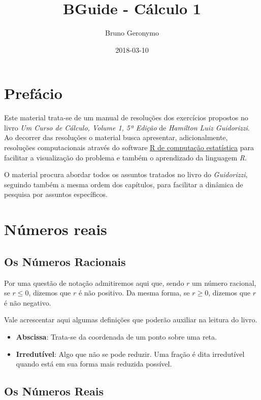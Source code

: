 \documentclass[]{book}
\title{BGuide - Cálculo 1}
\author{Bruno Geronymo}
\date{2018-03-10}
\providecommand{\tightlist}{%
  \setlength{\itemsep}{0pt}\setlength{\parskip}{0pt}}
\begin{document}
\maketitle

{
\setcounter{tocdepth}{1}
\tableofcontents
}
\chapter*{Prefácio}\label{prefacio}

Este material trata-se de um manual de resoluções dos exercícios
propostos no livro \emph{Um Curso de Cálculo, Volume 1, 5ª Edição} de
\emph{Hamilton Luiz Guidorizzi}. Ao decorrer das resoluções o material
busca apresentar, adicionalmente, resoluções computacionais através do
software \href{https://www.r-project.org/}{R de computação estatística}
para facilitar a visualização do problema e também o aprendizado da
linguagem \emph{R}.

O material procura abordar todos os assuntos tratados no livro do
\emph{Guidorizzi}, seguindo também a mesma ordem dos capítulos, para
facilitar a dinâmica de pesquisa por assuntos específicos.

\chapter{Números reais}\label{numeros-reais}

\section{Os Números Racionais}\label{os-numeros-racionais}

Por uma questão de notação admitiremos aqui que, sendo \(r\) um número
racional, se \(r \leqslant 0\), dizemos que \(r\) é não positivo. Da
mesma forma, se \(r \geqslant 0\), dizemos que \(r\) é não negativo.

Vale acrescentar aqui algumas definições que poderão auxiliar na leitura
do livro.

\begin{itemize}
\tightlist
\item
  \textbf{Abscissa}: Trata-se da coordenada de um ponto sobre uma reta.
\item
  \textbf{Irredutível}: Algo que não se pode reduzir. Uma fração é dita
  irredutível quando está em sua forma mais reduzida possível.
\end{itemize}

\section{Os Números Reais}\label{os-numeros-reais}
\end{document}
